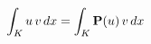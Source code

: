 \documentclass[preview]{standalone}
\begin{document}
\begin{align*}
\special{dvisvgm:raw <g id='unique000'>}\int_K u\, v\, dx = \int_K \mathbf{P}(u)\, v\, dx\special{dvisvgm:raw </g>}
\end{align*}
\end{document}

